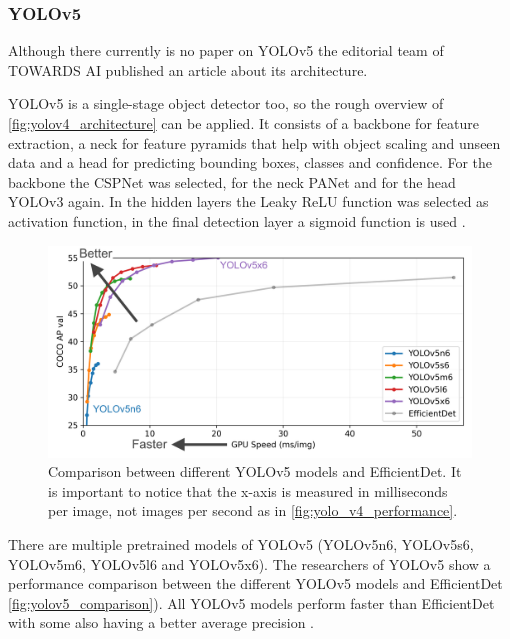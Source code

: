 \subsubsection{YOLOv5}

Although there currently is no paper on YOLOv5 the editorial team of TOWARDS AI published an article about its architecture.

YOLOv5 is a single-stage object detector too, so the rough overview of \autoref{fig:yolov4_architecture} can be applied. 
It consists of a backbone for feature extraction, a neck for feature pyramids that help with object scaling and unseen data and a head for predicting bounding boxes, classes and confidence. For the backbone the \ac{CSPNet} was selected, for the neck \ac{PANet} and for the head YOLOv3 again. In the hidden layers the Leaky ReLU function was selected as activation function, in the final detection layer a sigmoid function is used \autocite{towards_ai}.

\begin{figure}[!ht]
\centering
\includegraphics[width=\linewidth]{images/basics/yolov5_comparison}
\caption{Comparison between different YOLOv5 models and EfficientDet. It is important to notice that the x-axis is measured in milliseconds per image, not images per second as in \autoref{fig:yolo_v4_performance}. \autocite{ultralytics}}
\label{fig:yolov5_comparison}
\end{figure}

There are multiple pretrained models of YOLOv5 (YOLOv5n6, YOLOv5s6, YOLOv5m6, YOLOv5l6 and YOLOv5x6). The researchers of YOLOv5 show a performance comparison between the different YOLOv5 models and EfficientDet \autoref{fig:yolov5_comparison}). All YOLOv5 models perform faster than EfficientDet with some also having a better average precision \autocite{ultralytics}.

